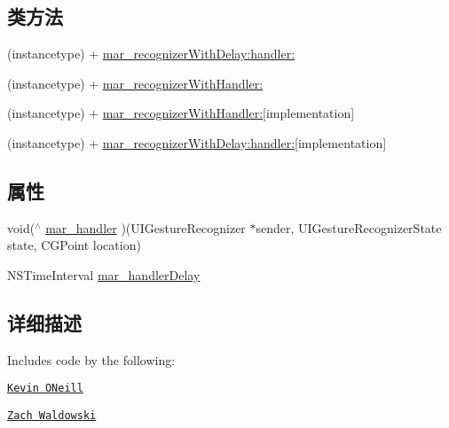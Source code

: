 \subsection*{类方法}
\begin{DoxyCompactItemize}
\item 
(instancetype) + \hyperlink{category_u_i_gesture_recognizer_07_m_a_r_e_x___block_08_a5e3253cef9d5a3acd1f74cc96b421e50}{mar\+\_\+recognizer\+With\+Delay\+:handler\+:}
\item 
(instancetype) + \hyperlink{category_u_i_gesture_recognizer_07_m_a_r_e_x___block_08_a6af3d4bc9e6997719c6147a4b440b662}{mar\+\_\+recognizer\+With\+Handler\+:}
\item 
(instancetype) + \hyperlink{category_u_i_gesture_recognizer_07_m_a_r_e_x___block_08_ac772310915a3eea3bd1eac13807beed4}{mar\+\_\+recognizer\+With\+Handler\+:}{\ttfamily  \mbox{[}implementation\mbox{]}}
\item 
(instancetype) + \hyperlink{category_u_i_gesture_recognizer_07_m_a_r_e_x___block_08_a9cbb97abb5bb9f5ecd5f743031c7d5ab}{mar\+\_\+recognizer\+With\+Delay\+:handler\+:}{\ttfamily  \mbox{[}implementation\mbox{]}}
\end{DoxyCompactItemize}
\subsection*{属性}
\begin{DoxyCompactItemize}
\item 
void($^\wedge$ \hyperlink{category_u_i_gesture_recognizer_07_m_a_r_e_x___block_08_a8ebb4c7ba4fb4b70b6e6f5f580f10eda}{mar\+\_\+handler} )(U\+I\+Gesture\+Recognizer $\ast$sender, U\+I\+Gesture\+Recognizer\+State state, C\+G\+Point location)
\item 
N\+S\+Time\+Interval \hyperlink{category_u_i_gesture_recognizer_07_m_a_r_e_x___block_08_a3a5aedf9c3b8ffce2fa72d8021cb656d}{mar\+\_\+handler\+Delay}
\end{DoxyCompactItemize}


\subsection{详细描述}
Includes code by the following\+:


\begin{DoxyItemize}
\item \href{https://github.com/kevinoneill}{\tt Kevin O\textquotesingle{}Neill}
\item \href{https://github.com/zwaldowski}{\tt Zach Waldowski} 
\end{DoxyItemize}


